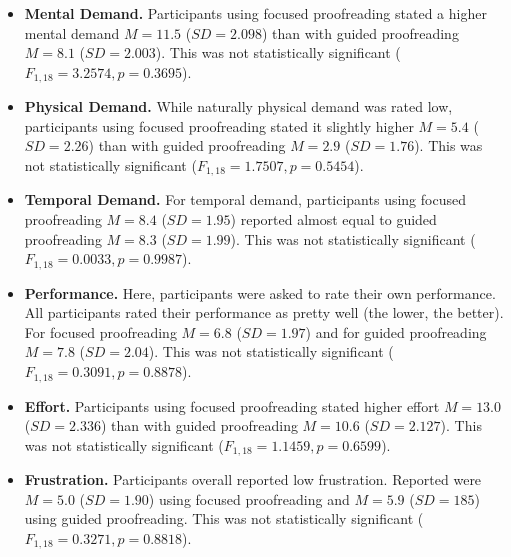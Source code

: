 \begin{itemize}
\item \textbf{Mental Demand.} Participants using focused proofreading stated a higher mental demand $M=11.5$ ($SD=2.098$) than with guided proofreading $M=8.1$ ($SD=2.003$). This was not statistically significant ($F_{1,18}=3.2574, p=0.3695$).
\item \textbf{Physical Demand.} While naturally physical demand was rated low, participants using focused proofreading stated it slightly higher $M=5.4$ ($SD=2.26$) than with guided proofreading $M=2.9$ ($SD=1.76$). This was not statistically significant ($F_{1,18}=1.7507, p=0.5454$).
\item \textbf{Temporal Demand.} For temporal demand, participants using focused proofreading $M=8.4$ ($SD=1.95$) reported almost equal to guided proofreading $M=8.3$ ($SD=1.99$). This was not statistically significant ($F_{1,18}=0.0033, p=0.9987$).
\item \textbf{Performance.} Here, participants were asked to rate their own performance. All participants rated their performance as pretty well (the lower, the better). For focused proofreading $M=6.8$ ($SD=1.97$) and for guided proofreading $M=7.8$ ($SD=2.04$). This was not statistically significant ($F_{1,18}=0.3091, p=0.8878$).
\item \textbf{Effort.} Participants using focused proofreading stated higher effort $M=13.0$ ($SD=2.336$) than with guided proofreading $M=10.6$ ($SD=2.127$). This was not statistically significant ($F_{1,18}=1.1459, p=0.6599$).
\item \textbf{Frustration.} Participants overall reported low frustration. Reported were $M=5.0$ ($SD=1.90$) using focused proofreading and $M=5.9$ ($SD=185$) using guided proofreading. This was not statistically significant ($F_{1,18}=0.3271, p=0.8818$).
\end{itemize}